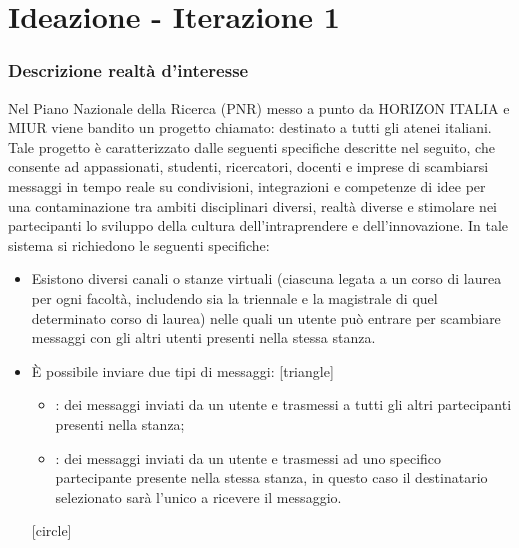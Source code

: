 \section{Ideazione - Iterazione 1}
 \begin{frame}[allowframebreaks] 
  \frametitle {Descrizione realtà d'interesse} 
   Nel Piano Nazionale della Ricerca (PNR)  messo a punto da HORIZON ITALIA e MIUR viene bandito un progetto chiamato:\newline
   \textbf{} destinato a tutti gli atenei italiani.\newline 
   Tale progetto è caratterizzato dalle seguenti specifiche descritte nel seguito, che consente ad appassionati, studenti,    
   ricercatori, docenti e imprese di scambiarsi messaggi in tempo reale su condivisioni, integrazioni e competenze di idee per una contaminazione tra ambiti 
   disciplinari diversi, realtà diverse e stimolare nei partecipanti lo sviluppo della  cultura dell’intraprendere e dell’innovazione.
   \newline 
   \newline 
   \newline 
   \newline
   In tale sistema si richiedono le seguenti specifiche:
   \begin{itemize} 
    \item Esistono diversi canali o stanze virtuali (ciascuna legata a un corso di laurea per ogni facoltà, includendo sia la triennale e la magistrale di quel 
          determinato corso di laurea) nelle quali un utente può entrare per scambiare messaggi con gli altri utenti presenti nella stessa stanza.
    \item \`E possibile inviare due tipi di messaggi: 
          [triangle]
          \begin{itemize} 
            \item {}: dei messaggi inviati da un utente e trasmessi a tutti gli altri partecipanti presenti nella stanza; 
            \item {}: dei messaggi inviati da un utente e trasmessi ad uno specifico partecipante presente nella stessa stanza, in questo caso il 
                                        destinatario selezionato sarà l’unico a ricevere il messaggio.
          \end{itemize}
          [circle]

\end{itemize}
\end{frame}
